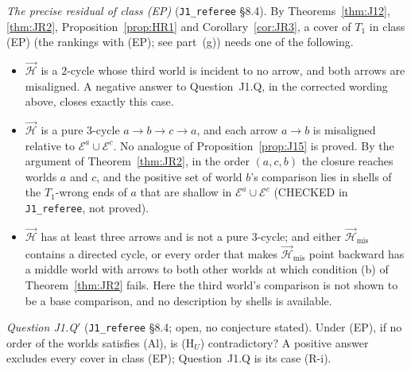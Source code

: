 \documentclass[11pt]{article}
\theoremstyle{definition}
\theoremstyle{remark}
\newcommand{\src}[1]{\texttt{#1}}
\begin{document}
\emph{The precise residual of class (EP)} (\src{J1\_referee} \S8.4). By Theorems~\ref{thm:J12}, \ref{thm:JR2}, Proposition~\ref{prop:HR1} and Corollary~\ref{cor:JR3}, a cover of $T_1$ in class (EP) (the rankings with (EP); see part~(g)) needs one of the following.
\begin{itemize}[leftmargin=*]
\item[\textbf{(R-i)}] $\vec{\mathcal H}$ is a $2$-cycle whose third world is incident to no arrow, and both arrows are misaligned. A negative answer to Question~J1.Q, in the corrected wording above, closes exactly this case.
\item[\textbf{(R-ii)}] $\vec{\mathcal H}$ is a pure $3$-cycle $a\to b\to c\to a$, and each arrow $a\to b$ is misaligned relative to $\mathcal E^a\cup\mathcal E^c$. No analogue of Proposition~\ref{prop:J15} is proved. By the argument of Theorem~\ref{thm:JR2}, in the order $(a,c,b)$ the closure reaches worlds $a$ and $c$, and the positive set of world $b$'s comparison lies in shells of the $T_1$-wrong ends of $a$ that are shallow in $\mathcal E^a\cup\mathcal E^c$ (CHECKED in \src{J1\_referee}, not proved).
\item[\textbf{(R-iii)}] $\vec{\mathcal H}$ has at least three arrows and is not a pure $3$-cycle; and either $\vec{\mathcal H}_{\mathrm{mis}}$ contains a directed cycle, or every order that makes $\vec{\mathcal H}_{\mathrm{mis}}$ point backward has a middle world with arrows to both other worlds at which condition (b) of Theorem~\ref{thm:JR2} fails. Here the third world's comparison is not shown to be a base comparison, and no description by shells is available.
\end{itemize}
\emph{Question J1.Q$'$} (\src{J1\_referee} \S8.4; open, no conjecture stated). Under (EP), if no order of the worlds satisfies (Al), is (H$_U$) contradictory? A positive answer excludes every cover in class (EP); Question~J1.Q is its case (R-i).
\end{document}
